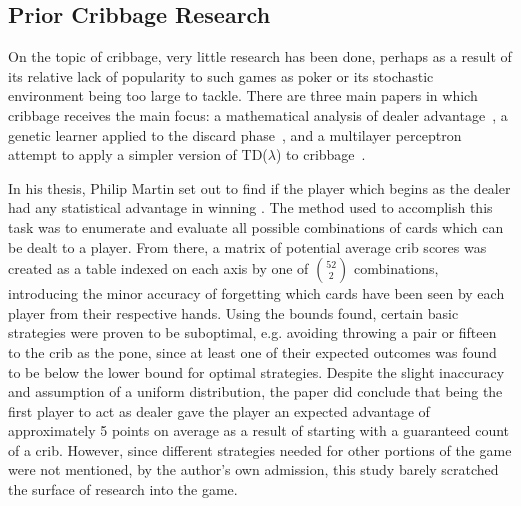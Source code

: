 
\subsection{Prior Cribbage Research}


On the topic of cribbage, very little research has been done,
perhaps as a result of its relative lack of popularity to such games as poker
or its stochastic environment being too large to tackle.
%
There are three main papers in which cribbage receives the main focus:
a mathematical analysis of dealer advantage~\cite{cribbage_optimal_ev},
a genetic learner applied to the discard phase~\cite{adaptive_cribbage},
and a multilayer perceptron attempt to apply a simpler version of TD($\lambda$)
to cribbage~\cite{roconnor_cs486}.

In his thesis,
Philip Martin set out to find if the player which begins as the dealer
had any statistical advantage in winning
\cite{cribbage_optimal_ev}.
%
The method used to accomplish this task was to enumerate and evaluate all
possible combinations of cards which can be dealt to a player.
%
From there,
a matrix of potential average crib scores was created as a table indexed on each
axis by one of ${52 \choose 2}$ combinations,
introducing the minor accuracy of forgetting which cards have been seen by each
player from their respective hands.
%
Using the bounds found,
certain basic strategies were proven to be suboptimal,
e.g. avoiding throwing a pair or fifteen to the crib as the pone,
since at least one of their expected outcomes
was found to be below the lower bound for optimal strategies.
%
Despite the slight inaccuracy and assumption of a uniform distribution,
the paper did conclude that being the first player to act as dealer gave the
player an expected advantage of approximately 5 points on average
as a result of starting with a guaranteed count of a crib.
%
However,
since different strategies needed for other portions of the game were not
mentioned,
by the author's own admission, this study barely scratched the surface of
research into the game.

